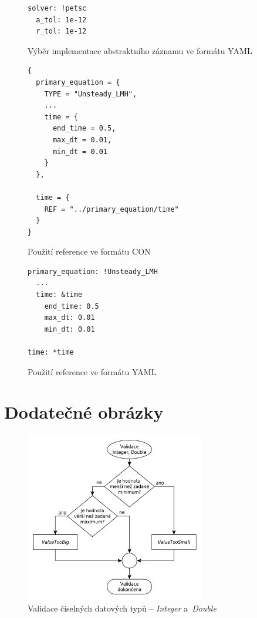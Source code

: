 \documentclass[FM,bw,DP]{tulthesis}
\begin{document}
\begin{figure}[h]
\begin{lstlisting}
solver: !petsc
  a_tol: 1e-12
  r_tol: 1e-12
\end{lstlisting}
\vspace*{-20pt}
\caption{Výběr implementace abstraktního záznamu ve formátu YAML}
\label{img:abstract-record-yaml}
\end{figure}

\clearpage

\begin{figure}[h]
\begin{lstlisting}
{
  primary_equation = {
    TYPE = "Unsteady_LMH",
    ...
    time = {
      end_time = 0.5, 
      max_dt = 0.01,
      min_dt = 0.01
    }
  },
  
  time = {
    REF = "../primary_equation/time"
  }
}
\end{lstlisting}
\vspace*{-20pt}
\caption{Použití reference ve formátu CON}
\label{img:reference-con}
\end{figure}

\begin{figure}[h]
\begin{lstlisting}
primary_equation: !Unsteady_LMH
  ...
  time: &time
    end_time: 0.5
    max_dt: 0.01
    min_dt: 0.01

time: *time
\end{lstlisting}
\vspace*{-20pt}
\caption{Použití reference ve formátu YAML}
\label{img:reference-yaml}
\end{figure}



\chapter{Dodatečné obrázky}

\begin{figure}[h]
	\centering
    \includegraphics[width=0.7\textwidth]{../img/validation_number.pdf}
    \caption{Validace číselných datových typů -- \textit{Integer} a~\textit{Double}}
	\label{img:validation_number}
\end{figure}
\end{document}

